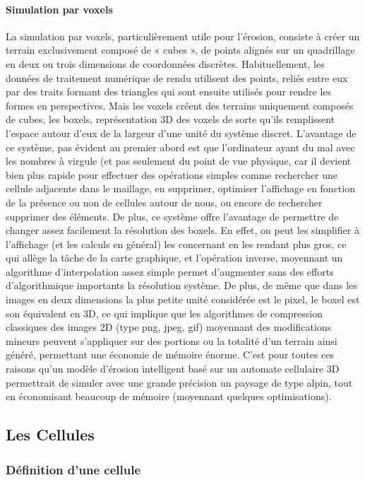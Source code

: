 \documentclass[a4paper,11pt]{article}
\begin{document}
\paragraph{Simulation par voxels}
\medbreak
La simulation par voxels, particulièrement utile pour l'érosion, consiste à créer un terrain exclusivement composé de « cubes », de points alignés sur un quadrillage en deux ou trois dimensions de coordonnées discrètes.
Habituellement, les données de traitement numérique de rendu utilisent des points, reliés entre eux par des traits formant des triangles qui sont ensuite utilisés pour rendre les formes en perspectives.
Mais les voxels créent des terrains uniquement composés de cubes, les boxels, représentation 3D des voxels de sorte qu'ils remplissent l'espace autour d'eux de la largeur d'une unité du système discret.
L'avantage de ce système, pas évident au premier abord est que l'ordinateur ayant du mal avec les nombres à virgule (et pas seulement du point de vue physique, car il devient bien plus rapide pour effectuer des opérations simples comme rechercher une cellule adjacente dans le maillage, en supprimer, optimiser l'affichage en fonction de la présence ou non de cellules autour de nous, ou encore de rechercher supprimer des éléments.
De plus, ce système offre l'avantage de permettre de changer assez facilement la résolution des boxels.
En effet, on peut les simplifier à l'affichage (et les calculs en général) les concernant en les rendant plus gros, ce qui allège la tâche de la carte graphique, et l'opération inverse, moyennant un algorithme d'interpolation assez simple permet d'augmenter sans des efforts d'algorithmique importants la résolution système.
De plus, de même que dans les images en deux dimensions la plus petite unité considérée est le pixel, le boxel est son équivalent en 3D, ce qui implique que les algorithmes de compression classiques des images 2D (type png, jpeg, gif) moyennant des modifications mineurs peuvent s'appliquer sur des portions ou la totalité d'un terrain ainsi généré, permettant une économie de mémoire énorme.
C'est pour toutes ces raisons qu'un modèle d'érosion intelligent basé sur un automate cellulaire 3D permettrait de simuler avec une grande précision un paysage de type alpin, tout en économisant beaucoup de mémoire (moyennant quelques optimisations).

\subsection{Les Cellules}
\subsubsection{Définition d'une cellule}
\end{document}

